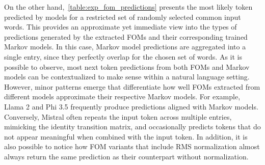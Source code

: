 On the other hand,~\cref{table:exp_fom_predictions} presents the most likely token predicted by models for a restricted set of randomly selected common input words.
This provides an approximate yet immediate view into the types of predictions generated by the extracted FOMs and their corresponding trained Markov models.
In this case, Markov model predictions are aggregated into a single entry, since they perfectly overlap for the chosen set of words.
As it is possible to observe, most next token predictions from both FOMs and Markov models can be contextualized to make sense within a natural language setting.
However, minor patterns emerge that differentiate how well FOMs extracted from different models approximate their respective Markov models.
For example, Llama 2 and Phi 3.5 frequently produce predictions aligned with Markov models.
Conversely, Mistral often repeats the input token across multiple entries, mimicking the identity transition matrix, and occasionally predicts tokens that do not appear meaningful when combined with the input token.
In addition, it is also possible to notice how FOM variants that include RMS normalization almost always return the same prediction as their counterpart without normalization.

\begin{table}
    \centering
    \caption[Visualization of the most likely token predicted given common input tokens for various models.]{Visualization of the most likely token predicted by FOM, FOM with RMS and Markov model given common input tokens for Llama 2, Mistral and Phi 3.5.}
    \label{table:exp_fom_predictions}
\end{table}

